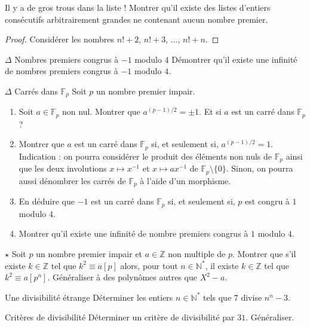 \documentclass[french,a4paper]{article}
\newcommand{\N}{\mathbb{N}}
\newcommand{\Z}{\mathbb{Z}}
\newcommand{\st}{^*}
\newcommand{\inv}{^{-1}}
\newcommand{\F}{\mathbb{F}}
\theoremstyle{plain}
\theoremstyle{definition}
\theoremstyle{remark}
\begin{document}
\begin{ex}{Il y a de gros trous dans la liste !}
	Montrer qu'il existe des listes d'entiers consécutifs arbitrairement grandes ne contenant aucun nombre premier.
\end{ex}
\begin{proof}
	Considérer les nombres $n!+2$, $n!+3$, $\ldots$, $n!+n$.
\end{proof}

\begin{ex}[Moulin.48]{$\Delta$ Nombres premiers congrus à $-1$ modulo $4$}
	Démontrer qu'il existe une infinité de nombres premiers congrus à $-1$ modulo $4$.
\end{ex}

\begin{ex}[Moulin.49]{$\Delta$ Carrés dans $\F_p$}
	Soit $p$ un nombre premier impair.
	\begin{enumerate}
		\item Soit $a\in\F_p$ non nul. Montrer que $a^{(p-1)/2}=\pm 1$. Et si $a$ est un carré dans $\F_p$ ?
		\item Montrer que $a$ est un carré dans $\F_p$ si, et seulement si, $a^{(p-1)/2}=1$. Indication : on pourra considérer le produit des éléments non nuls de $\F_p$ ainsi que les deux involutions $x\mapsto x\inv$ et $x\mapsto ax\inv$ de $\F_p\setminus\{0\}$. Sinon, on pourra aussi dénombrer les carrés de $\F_p$ à l'aide d'un morphisme.
		\item En déduire que $-1$ est un carré dans $\F_p$ si, et seulement si, $p$ est congru à $1$ modulo $4$.
		\item Montrer qu'il existe une infinité de nombre premiers congrus à $1$ modulo $4$.
	\end{enumerate}
\end{ex}

\begin{ex}[Moulin.50]{$\star$}
	Soit $p$ un nombre premier impair et $a\in\Z$ non multiple de $p$. Montrer que s'il existe $k\in\Z$ tel que $k^2\equiv a[p]$ alors, pour tout $n\in\N\st$, il existe $k\in\Z$ tel que $k^2\equiv a[p^n]$. Généraliser à des polynômes autres que $X^2-a$.
\end{ex}

\begin{ex}[Moulin.51]{Une divisibilité étrange}
	Déterminer les entiers $n\in\N\st$ tels que $7$ divise $n^n-3$.
\end{ex}

\begin{ex}[Sageaux]{Critères de divisibilité}
	Déterminer un critère de divisibilité par $31$. Généraliser.
\end{ex}
\end{document}

